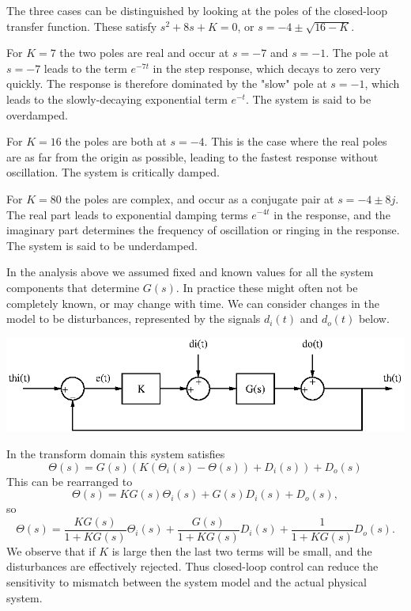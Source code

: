 \documentclass[10pt]{beamer}
\begin{document}
The three cases can be distinguished by looking at the poles of the closed-loop transfer function.  These satisfy $s^2 + 8s + K=0$, or $s = -4 \pm \sqrt{16-K}$.  

For $K=7$ the two poles are real and occur at $s = -7$ and $s=-1$.  The pole at $s=-7$ leads to the term $e^{-7t}$ in the step response, which decays to zero very quickly.  The response is therefore dominated by the "slow" pole at $s=-1$, which leads to the slowly-decaying exponential term $e^{-t}$.  The system is said to be overdamped.  

For $K=16$ the poles are both at $s=-4$.  This is the case where the real poles are as far from the origin as possible, leading to the fastest response without oscillation.  The system is critically damped.

For $K=80$ the poles are complex, and occur as a conjugate pair at $s = -4 \pm 8j$.  The real part leads to exponential damping terms $e^{-4t}$ in the response, and the imaginary part determines the frequency of oscillation or ringing in the response.  The system is said to be underdamped.

In the analysis above we assumed fixed and known values for all the system components that determine $G(s)$.  In practice these might often not be completely known, or may change with time.  We can consider changes in the model to be disturbances, represented by the signals $d_i(t)$ and $d_o(t)$ below.
\begin{center}
  \includegraphics{propcontrollerdist}
\end{center}
In the transform domain this system satisfies
\begin{equation*}
  \Theta(s) = G(s) (K (\Theta_i(s) - \Theta(s)) + D_i(s)) + D_o(s)
\end{equation*}
This can be rearranged to
\begin{equation*}
  \Theta(s) = K G(s) \Theta_i(s) + G(s) D_i(s) + D_o(s),
\end{equation*}
so
\begin{equation*}
  \Theta(s) = \frac{K G(s)}{1 + K G(s)} \Theta_i(s) + \frac{G(s)}{1 + K G(s)} D_i(s) + \frac{1}{1 + K G(s)} D_o(s).
\end{equation*}
We observe that if $K$ is large then the last two terms will be small, and the disturbances are effectively rejected.  Thus closed-loop control can reduce the sensitivity to mismatch between the system model and the actual physical system.
\end{document}
